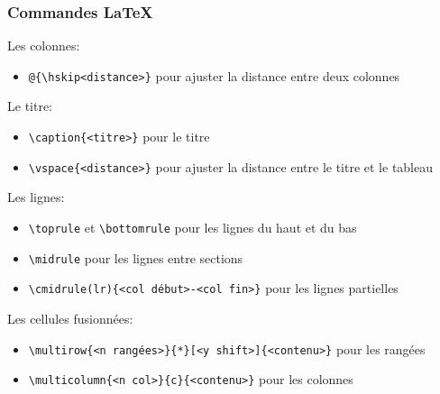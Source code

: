 \documentclass[aspectratio=169]{beamer}
\begin{document}
\begin{frame}[fragile]\frametitle{Commandes LaTeX}

\vspace{-4mm}
\footnotesize

Les colonnes:
\vspace{-\parskip}
\begin{itemize}
	\item \verb!@{\hskip<distance>}! pour ajuster la distance entre deux colonnes
\end{itemize}

Le titre:
\vspace{-\parskip}
\begin{itemize}
	\item \verb!\caption{<titre>}! pour le titre
	\item \verb!\vspace{<distance>}! pour ajuster la distance entre le titre et le tableau
\end{itemize}

Les lignes:
\vspace{-\parskip}
\begin{itemize}
	\item \verb!\toprule! et \verb!\bottomrule! pour les lignes du haut et du bas
	\item \verb!\midrule! pour les lignes entre sections
	\item \verb!\cmidrule(lr){<col début>-<col fin>}! pour les lignes partielles
\end{itemize}

Les cellules fusionnées:
\vspace{-\parskip}
\begin{itemize}
	\item \verb!\multirow{<n rangées>}{*}[<y shift>]{<contenu>}! pour les rangées
	\item \verb!\multicolumn{<n col>}{c}{<contenu>}! pour les colonnes
\end{itemize}



\end{frame}
\end{document}
